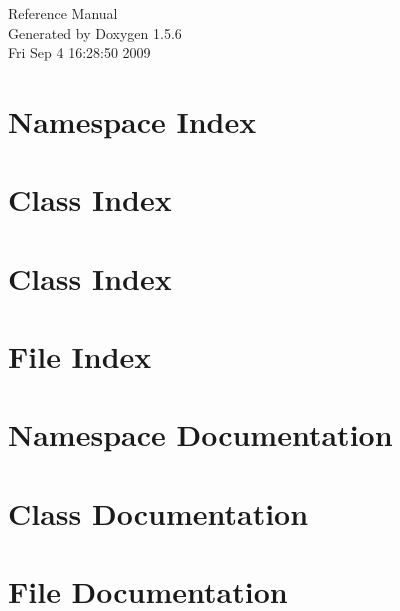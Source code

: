 \documentclass[a4paper]{book}
\begin{document}
\begin{titlepage}
\vspace*{7cm}
\begin{center}
{\Large Reference Manual}\\
\vspace*{1cm}
{\large Generated by Doxygen 1.5.6}\\
\vspace*{0.5cm}
{\small Fri Sep 4 16:28:50 2009}\\
\end{center}
\end{titlepage}
\clearemptydoublepage
{}
\tableofcontents
\clearemptydoublepage
{}
\chapter{Namespace Index}

\chapter{Class Index}

\chapter{Class Index}

\chapter{File Index}

\chapter{Namespace Documentation}

\chapter{Class Documentation}





















\chapter{File Documentation}








\printindex
\end{document}
